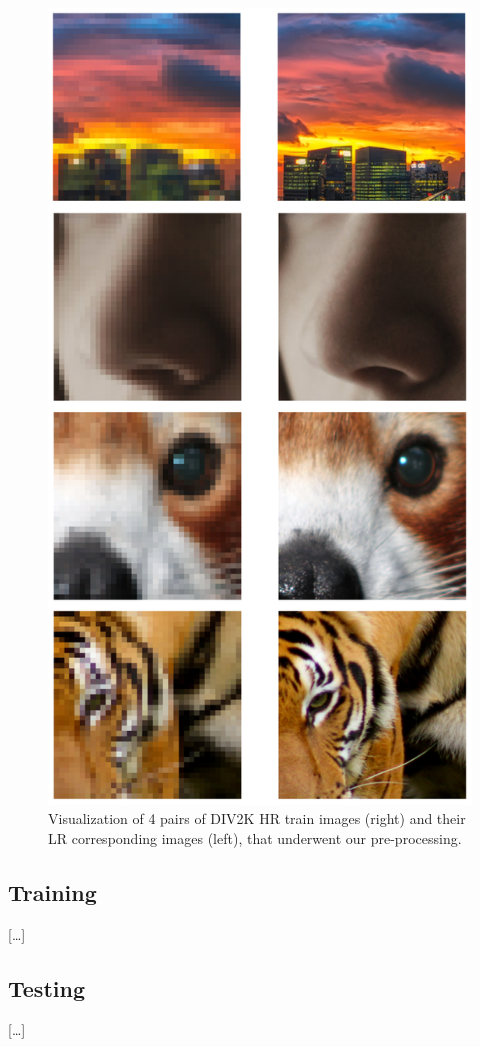 \documentclass{article}
\begin{document}
{    \begin{figure}[p]
        \centering
        \includegraphics[height=0.9\textheight]{images/DIV2K_HRLR.png}
        \caption{Visualization of 4 pairs of DIV2K HR train images (right) and their LR corresponding images (left), that underwent our pre-processing.}
        \label{fig:div2k-train-pair}
    \end{figure}

    \subsection{Training}
    \label{subsec:training}

    […]

    \subsection{Testing}
    \label{subsec:testing}

    […]
}
\end{document}
